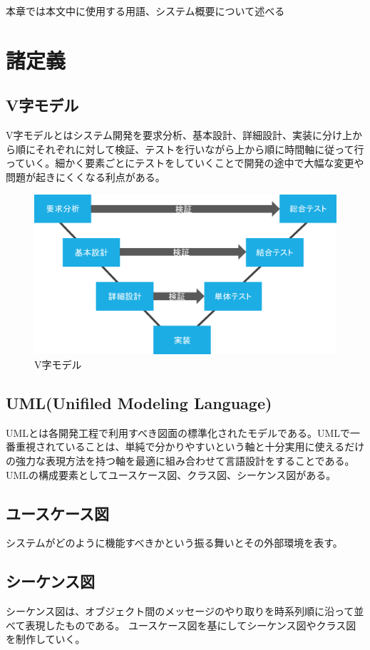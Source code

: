 本章では本文中に使用する用語、システム概要について述べる

\section{諸定義}

\subsection*{V字モデル}
V字モデルとはシステム開発を要求分析、基本設計、詳細設計、実装に分け上から順にそれぞれに対して検証、テストを行いながら上から順に時間軸に従って行っていく。細かく要素ごとにテストをしていくことで開発の途中で大幅な変更や問題が起きにくくなる利点がある。

\begin{figure}[htbp]
\centering
\includegraphics[width=12cm]{./pic/vjimodel.eps}
\caption{V字モデル}
\label{v_model}
\end{figure}

\subsection*{UML(Unifiled Modeling Language)}
UMLとは各開発工程で利用すべき図面の標準化されたモデルである。UMLで一番重視されていることは、単純で分かりやすいという軸と十分実用に使えるだけの強力な表現方法を持つ軸を最適に組み合わせて言語設計をすることである。UMLの構成要素としてユースケース図、クラス図、シーケンス図がある。\cite{uml}

\subsection*{ユースケース図}
システムがどのように機能すべきかという振る舞いとその外部環境を表す。


\subsection*{シーケンス図}
シーケンス図は、オブジェクト間のメッセージのやり取りを時系列順に沿って並べて表現したものである。
ユースケース図を基にしてシーケンス図やクラス図を制作していく。

